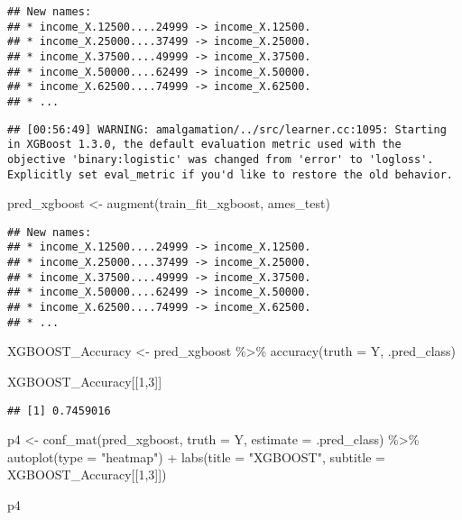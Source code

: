 \documentclass[
]{article}
\newenvironment{Shaded}{\begin{snugshade}}{\end{snugshade}}
\newcommand{\AttributeTok}[1]{\textcolor[rgb]{0.77,0.63,0.00}{#1}}
\newcommand{\DecValTok}[1]{\textcolor[rgb]{0.00,0.00,0.81}{#1}}
\newcommand{\FunctionTok}[1]{\textcolor[rgb]{0.00,0.00,0.00}{#1}}
\newcommand{\NormalTok}[1]{#1}
\newcommand{\OtherTok}[1]{\textcolor[rgb]{0.56,0.35,0.01}{#1}}
\newcommand{\SpecialCharTok}[1]{\textcolor[rgb]{0.00,0.00,0.00}{#1}}
\newcommand{\StringTok}[1]{\textcolor[rgb]{0.31,0.60,0.02}{#1}}
\begin{document}
\begin{verbatim}
## New names:
## * income_X.12500....24999 -> income_X.12500.
## * income_X.25000....37499 -> income_X.25000.
## * income_X.37500....49999 -> income_X.37500.
## * income_X.50000....62499 -> income_X.50000.
## * income_X.62500....74999 -> income_X.62500.
## * ...
\end{verbatim}

\begin{verbatim}
## [00:56:49] WARNING: amalgamation/../src/learner.cc:1095: Starting in XGBoost 1.3.0, the default evaluation metric used with the objective 'binary:logistic' was changed from 'error' to 'logloss'. Explicitly set eval_metric if you'd like to restore the old behavior.
\end{verbatim}

\begin{Shaded}
\begin{Highlighting}[]
\NormalTok{pred\_xgboost }\OtherTok{\textless{}{-}} \FunctionTok{augment}\NormalTok{(train\_fit\_xgboost, ames\_test)}
\end{Highlighting}
\end{Shaded}

\begin{verbatim}
## New names:
## * income_X.12500....24999 -> income_X.12500.
## * income_X.25000....37499 -> income_X.25000.
## * income_X.37500....49999 -> income_X.37500.
## * income_X.50000....62499 -> income_X.50000.
## * income_X.62500....74999 -> income_X.62500.
## * ...
\end{verbatim}

\begin{Shaded}
\begin{Highlighting}[]
\NormalTok{XGBOOST\_Accuracy }\OtherTok{\textless{}{-}}\NormalTok{ pred\_xgboost }\SpecialCharTok{\%\textgreater{}\%} 
  \FunctionTok{accuracy}\NormalTok{(}\AttributeTok{truth =}\NormalTok{ Y, .pred\_class)}

\NormalTok{XGBOOST\_Accuracy[[}\DecValTok{1}\NormalTok{,}\DecValTok{3}\NormalTok{]]}
\end{Highlighting}
\end{Shaded}

\begin{verbatim}
## [1] 0.7459016
\end{verbatim}

\begin{Shaded}
\begin{Highlighting}[]
\NormalTok{p4 }\OtherTok{\textless{}{-}} \FunctionTok{conf\_mat}\NormalTok{(pred\_xgboost, }\AttributeTok{truth =}\NormalTok{ Y, }\AttributeTok{estimate =}\NormalTok{ .pred\_class) }\SpecialCharTok{\%\textgreater{}\%} 
  \FunctionTok{autoplot}\NormalTok{(}\AttributeTok{type =} \StringTok{"heatmap"}\NormalTok{) }\SpecialCharTok{+}
  \FunctionTok{labs}\NormalTok{(}\AttributeTok{title =} \StringTok{"XGBOOST"}\NormalTok{,}
       \AttributeTok{subtitle =}\NormalTok{ XGBOOST\_Accuracy[[}\DecValTok{1}\NormalTok{,}\DecValTok{3}\NormalTok{]])}

\NormalTok{p4}
\end{Highlighting}
\end{Shaded}
\end{document}
